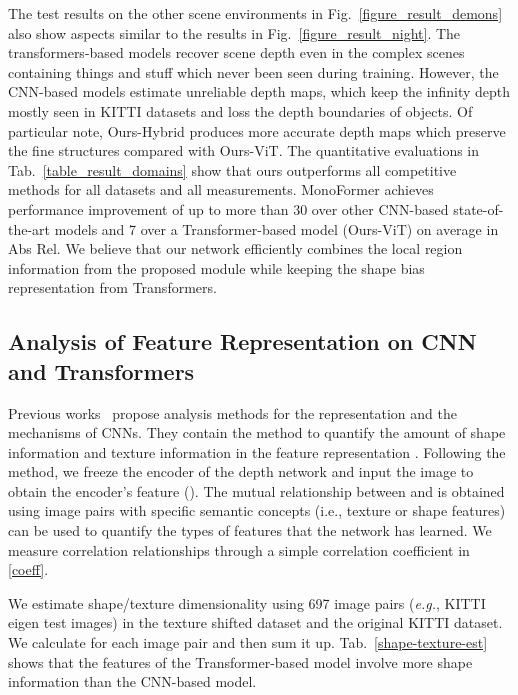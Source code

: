 \documentclass[letterpaper]{article} \usepackage{aaai23}  \usepackage{times}  \usepackage{helvet}  \usepackage{courier}  \usepackage[hyphens]{url}  \usepackage{graphicx} \urlstyle{rm} \def\UrlFont{\rm}  \usepackage{natbib}  \usepackage{caption} \frenchspacing  \setlength{\pdfpagewidth}{8.5in} \setlength{\pdfpageheight}{11in} \usepackage{algorithm}
\newcommand{\tabref}[1]{Tab.~\ref{#1}}
\newcommand{\figref}[1]{Fig.~\ref{#1}}
\begin{document}
The test results on the other scene environments in \figref{figure_result_demons} also show aspects similar to the results in \figref{figure_result_night}.
The transformers-based models recover scene depth even in the complex scenes containing things and stuff which never been seen during training. However, the CNN-based models estimate unreliable depth maps, which keep the infinity depth mostly seen in KITTI datasets and loss the depth boundaries of objects. 
Of particular note, Ours-Hybrid produces more accurate depth maps which preserve the fine structures compared with Ours-ViT. The quantitative evaluations in \tabref{table_result_domains} show that ours outperforms all competitive methods for all datasets and all measurements. 
MonoFormer achieves performance improvement of up to more than 30 over other CNN-based state-of-the-art models and 7 over a Transformer-based model (Ours-ViT) on average in Abs Rel.
We believe that our network efficiently combines the local region information from the proposed module while keeping the shape bias representation from Transformers.

\subsection{Analysis of Feature Representation on CNN and Transformers}

Previous works~\cite{geirhos2018imagenet,esser2020disentangling,islam2021shape} propose analysis methods for the representation and the mechanisms of CNNs. They contain the method to quantify the amount of shape information and texture information in the feature representation \cite{islam2021shape}. 
Following the method, we freeze the encoder  of the depth network and input the image  to obtain the encoder's feature  (). The mutual relationship between  and  is obtained using image pairs  with specific semantic concepts (i.e., texture or shape features) can be used to quantify the types of features that the network has learned. We measure correlation relationships through a simple correlation coefficient  in \eqref{coeff}.

We estimate shape/texture dimensionality using 697 image pairs (\textit{e.g.}, KITTI eigen test images) in the texture shifted dataset and the original KITTI dataset. We calculate  for each image pair and then sum it up. \tabref{shape-texture-est} shows that the features of the Transformer-based model involve more shape information than the CNN-based model.
\end{document}
